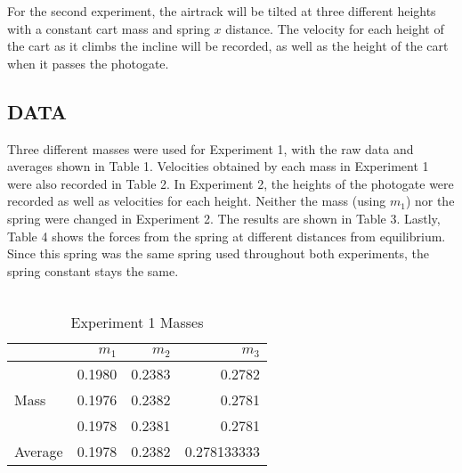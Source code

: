 \documentclass [12pt, letterpaper, twoside] {article}
\begin{document}
\noindent
For the second experiment, the airtrack will be tilted at three different heights with a constant cart mass and spring \(x\) distance. The velocity for each height of the cart as it climbs the incline will be recorded, as well as the height of the cart when it passes the photogate. 

\subsection* {DATA}

Three different masses were used for Experiment 1, with the raw data and averages shown in Table 1. Velocities obtained by each mass in Experiment 1 were also recorded in Table 2. In Experiment 2, the heights of the photogate were recorded as well as velocities for each height. Neither the mass (using \(m_{1}\)) nor the spring were changed in Experiment 2. The results are shown in Table 3. Lastly, Table 4 shows the forces from the spring at different distances from equilibrium. Since this spring was the same spring used throughout both experiments, the spring constant stays the same. \\\\

\begin {table}[h]
  \centering
  \begin {tabular} {| l | r | r | r |}
    \hline\hline
    & \(m_{1}\) & \(m_{2}\) & \(m_{3}\) \\
    \hline
    \multirow{3}{*}{Mass} & 0.1980 & 0.2383 & 0.2782 \\
    & 0.1976 & 0.2382 & 0.2781 \\
    & 0.1978 & 0.2381 & 0.2781 \\
    \hline
    Average & 0.1978 & 0.2382 & 0.278133333 \\
    \hline\hline
  \end {tabular}
  \caption {Experiment 1 Masses}
\end {table}
\end{document}
